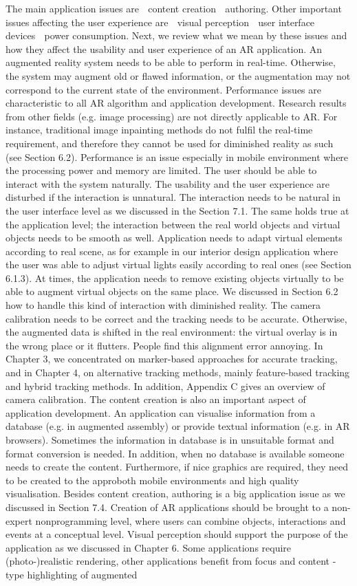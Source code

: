 The main application issues are 􀁸 content creation 􀁸 authoring. Other important issues affecting the user experience are 􀁸 visual perception 􀁸 user interface 􀁸 devices 􀁸 power consumption. Next, we review what we mean by these issues and how they affect the usability and user experience of an AR application. An augmented reality system needs to be able to perform in real-time. Otherwise, the system may augment old or flawed information, or the augmentation may not correspond to the current state of the environment. Performance issues are characteristic to all AR algorithm and application development. Research results from other fields (e.g. image processing) are not directly applicable to AR. For instance, traditional image inpainting methods do not fulfil the real-time requirement, and therefore they cannot be used for diminished reality as such (see Section 6.2). Performance is an issue especially in mobile environment where the processing power and memory are limited. The user should be able to interact with the system naturally. The usability and the user experience are disturbed if the interaction is unnatural. The interaction needs to be natural in the user interface level as we discussed in the Section 7.1. The same holds true at the application level; the interaction between the real world objects and virtual objects needs to be smooth as well. Application needs to adapt virtual elements according to real scene, as for example in our interior design application where the user was able to adjust virtual lights easily according to real ones (see Section 6.1.3). At times, the application needs to remove existing objects virtually to be able to augment virtual objects on the same place. We discussed in Section 6.2 how to handle this kind of interaction with diminished reality. The camera calibration needs to be correct and the tracking needs to be accurate. Otherwise, the augmented data is shifted in the real environment: the virtual overlay is in the wrong place or it flutters. People find this alignment error annoying. In Chapter 3, we concentrated on marker-based approaches for accurate tracking, and in Chapter 4, on alternative tracking methods, mainly feature-based tracking and hybrid tracking methods. In addition, Appendix C gives an overview of camera calibration. The content creation is also an important aspect of application development. An application can visualise information from a database (e.g. in augmented assembly) or provide textual information (e.g. in AR browsers). Sometimes the information in database is in unsuitable format and format conversion is needed. In addition, when no database is available someone needs to create the content. Furthermore, if nice graphics are required, they need to be created to the approboth mobile environments and high quality visualisation. Besides content creation, authoring is a big application issue as we discussed in Section 7.4. Creation of AR applications should be brought to a non-expert nonprogramming level, where users can combine objects, interactions and events at a conceptual level. Visual perception should support the purpose of the application as we discussed in Chapter 6. Some applications require (photo-)realistic rendering, other applications benefit from focus and content -type highlighting of augmented 